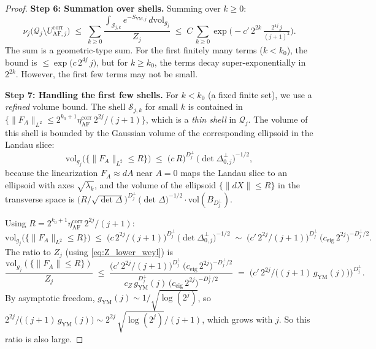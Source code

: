 \begin{proof}
\textbf{Step 6: Summation over shells.} Summing over $k\ge 0$:
\begin{equation}
\label{eq:shell_sum}
  \nu_{j}\bigl(\mathcal{Q}_{j}\setminus U_{\mathrm{AF},j}^{\mathrm{
  corr}}\bigr)
  \;\le\;\sum_{k\ge 0}\frac{\int_{\mathcal{S}_{j,k}}e^{-S_{\mathrm{
  YM},j}}\,d\mathrm{vol}_{g_{j}}}{Z_{j}}
  \;\le\;C\,\sum_{k\ge 0}\exp\!\bigl(-c'\,2^{2k}\,
  \tfrac{2^{4j}\,j}{(j+1)^{2}}\bigr).
\end{equation}
The sum is a geometric-type sum. For the first finitely many terms
($k<k_{0}$), the bound is $\le\exp\!\bigl(c\,2^{4j}\,j\bigr)$, but
for $k\ge k_{0}$, the terms decay super-exponentially in $2^{2k}$.
However, the first few terms may not be small.

\textbf{Step 7: Handling the first few shells.} For $k<k_{0}$ (a
fixed finite set), we use a \emph{refined} volume bound. The shell
$\mathcal{S}_{j,k}$ for small $k$ is contained in
$\{\|F_{A}\|_{L^{2}}\le 2^{k_{0}+1}\eta_{\mathrm{AF}}^{\mathrm{corr}}
\,2^{2j}/(j+1)\}$, which is a \emph{thin shell} in $\mathcal{Q}_{j}$.
The volume of this shell is bounded by the Gaussian volume of the
corresponding ellipsoid in the Landau slice:
\begin{equation}
\label{eq:thin_shell_vol}
  \mathrm{vol}_{g_{j}}\bigl(\{\|F_{A}\|_{L^{2}}\le R\}\bigr)
  \;\le\;\bigl(c\,R\bigr)^{D_{j}^{\perp}}\,
  \bigl(\det\Delta_{0,j}^{\perp}\bigr)^{-1/2},
\end{equation}
because the linearization $F_{A}\approx dA$ near $A=0$ maps the
Landau slice to an ellipsoid with axes $\sqrt{\lambda_{k}}$, and the
volume of the ellipsoid $\{\|dX\|\le R\}$ in the transverse space is
$\bigl(R/\sqrt{\det\Delta}\bigr)^{D_{j}^{\perp}}\,
\bigl(\det\Delta\bigr)^{-1/2}\cdot\mathrm{vol}(B_{D_{j}^{\perp}})$.

Using $R=2^{k_{0}+1}\eta_{\mathrm{AF}}^{\mathrm{corr}}\,2^{2j}/(j+1)$:
\begin{equation}
\label{eq:thin_shell_vol_2}
  \mathrm{vol}_{g_{j}}\bigl(\{\|F_{A}\|_{L^{2}}\le R\}\bigr)
  \;\le\;\bigl(c\,2^{2j}/(j+1)\bigr)^{D_{j}^{\perp}}\,
  \bigl(\det\Delta_{0,j}^{\perp}\bigr)^{-1/2}
  \;\sim\;\bigl(c'\,2^{2j}/(j+1)\bigr)^{D_{j}^{\perp}}\,
  \bigl(c_{\mathrm{eig}}\,2^{2j}\bigr)^{-D_{j}^{\perp}/2}.
\end{equation}
The ratio to $Z_{j}$ (using \eqref{eq:Z_lower_weyl}) is
\begin{equation}
\label{eq:thin_shell_ratio}
  \frac{\mathrm{vol}_{g_{j}}(\{\|F_{A}\|\le R\})}{Z_{j}}
  \;\le\;\frac{\bigl(c'\,2^{2j}/(j+1)\bigr)^{D_{j}^{\perp}}\,
  \bigl(c_{\mathrm{eig}}\,2^{2j}\bigr)^{-D_{j}^{\perp}/2}}{
  c_{Z}\,g_{\mathrm{YM}}^{D_{j}^{\perp}}(j)\,
  \bigl(c_{\mathrm{eig}}\,2^{2j}\bigr)^{-D_{j}^{\perp}/2}}
  \;=\;\bigl(c'\,2^{2j}/\bigl((j+1)\,g_{\mathrm{YM}}(j)\bigr)\bigr)^{
  D_{j}^{\perp}}.
\end{equation}
By asymptotic freedom, $g_{\mathrm{YM}}(j)\sim 1/\sqrt{\log(2^{j})}$,
so $2^{2j}/\bigl((j+1)\,g_{\mathrm{YM}}(j)\bigr)\sim 2^{2j}\,
\sqrt{\log(2^{j})}/(j+1)$, which grows with $j$. So this ratio is
also large.


\end{proof}
